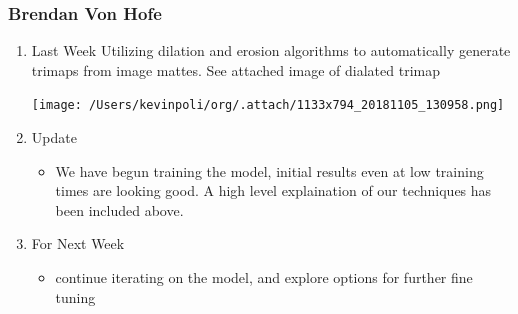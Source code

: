 \documentclass[15pt]{article}
\begin{document}
\subsubsection{Brendan Von Hofe}
\label{sec:orgc9a3b65}
\begin{enumerate}
\item Last Week
\label{sec:orgc212c7f}
Utilizing dilation and erosion algorithms to automatically generate trimaps from
image mattes. See attached image of dialated trimap

\begin{center}
\texttt{[image: /Users/kevinpoli/org/.attach/1133x794\_20181105\_130958.png]}
\end{center}
\item Update
\label{sec:orgf5b0dd7}
\begin{itemize}
\item We have begun training the model, initial results even at low training times
are looking good. A high level explaination of our techniques has been
included above.
\end{itemize}
\item For Next Week
\label{sec:orgf512713}
\begin{itemize}
\item continue iterating on the model, and explore options for further fine tuning
\end{itemize}
\end{enumerate}
\end{document}
